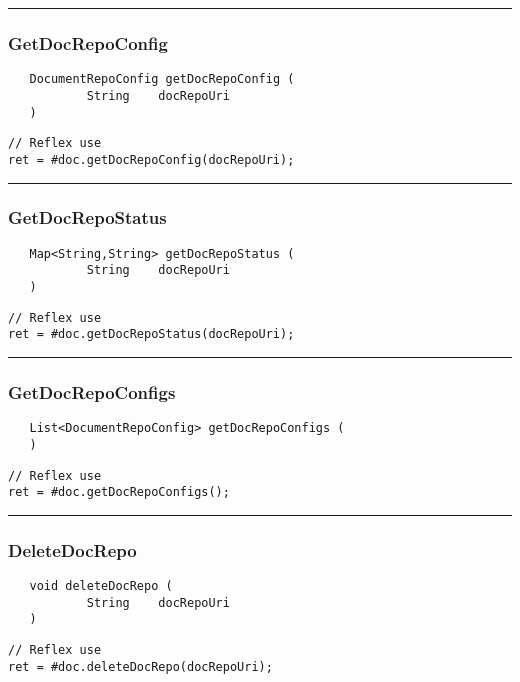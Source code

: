 \rule{15cm}{2pt}
\subsubsection{GetDocRepoConfig}
\label{Api:GetDocRepoConfig}
\begin{verbatim}
   DocumentRepoConfig getDocRepoConfig (
           String    docRepoUri
   )
\end{verbatim}
\begin{lstlisting}[language=reflex]
// Reflex use
ret = #doc.getDocRepoConfig(docRepoUri);
\end{lstlisting}



\rule{15cm}{2pt}
\subsubsection{GetDocRepoStatus}
\label{Api:GetDocRepoStatus}
\begin{verbatim}
   Map<String,String> getDocRepoStatus (
           String    docRepoUri
   )
\end{verbatim}
\begin{lstlisting}[language=reflex]
// Reflex use
ret = #doc.getDocRepoStatus(docRepoUri);
\end{lstlisting}



\rule{15cm}{2pt}
\subsubsection{GetDocRepoConfigs}
\label{Api:GetDocRepoConfigs}
\begin{verbatim}
   List<DocumentRepoConfig> getDocRepoConfigs (
   )
\end{verbatim}
\begin{lstlisting}[language=reflex]
// Reflex use
ret = #doc.getDocRepoConfigs();
\end{lstlisting}



\rule{15cm}{2pt}
\subsubsection{DeleteDocRepo}
\label{Api:DeleteDocRepo}
\begin{verbatim}
   void deleteDocRepo (
           String    docRepoUri
   )
\end{verbatim}
\begin{lstlisting}[language=reflex]
// Reflex use
ret = #doc.deleteDocRepo(docRepoUri);
\end{lstlisting}



